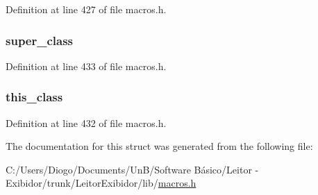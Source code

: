 Definition at line 427 of file macros.\+h.

\hypertarget{struct_class_file_a85a7fa4c7fd5d455b77e525d952f440f}{}
\subsubsection[{super\+\_\+class}]{ super\+\_\+class}\label{struct_class_file_a85a7fa4c7fd5d455b77e525d952f440f}


Definition at line 433 of file macros.\+h.

\hypertarget{struct_class_file_afd1a9f5d893befc9ea66f915fd6fa039}{}
\subsubsection[{this\+\_\+class}]{ this\+\_\+class}\label{struct_class_file_afd1a9f5d893befc9ea66f915fd6fa039}


Definition at line 432 of file macros.\+h.



The documentation for this struct was generated from the following file\+:\begin{DoxyCompactItemize}
\item 
C\+:/\+Users/\+Diogo/\+Documents/\+Un\+B/\+Software Básico/\+Leitor -\/ Exibidor/trunk/\+Leitor\+Exibidor/lib/\hyperlink{macros_8h}{macros.\+h}\end{DoxyCompactItemize}
